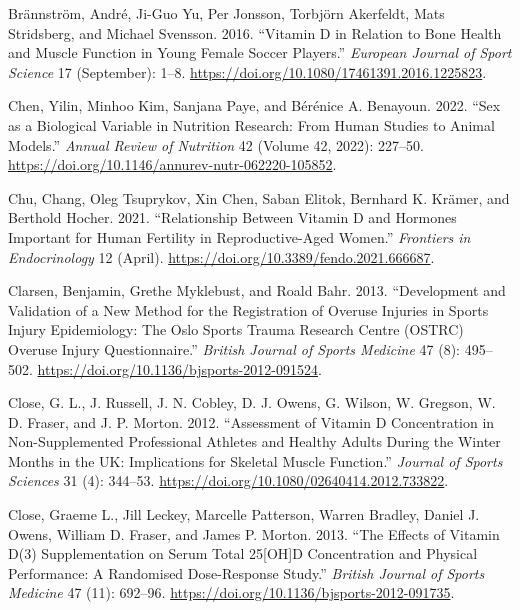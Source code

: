 \documentclass[
]{article}
\newlength{\cslhangindent}
\newenvironment{CSLReferences}[2] %
 {\begin{list}{}{%
  \setlength{\itemindent}{0pt}
  \setlength{\leftmargin}{0pt}
  \setlength{\parsep}{0pt}
  \ifodd #1
   \setlength{\leftmargin}{\cslhangindent}
   \setlength{\itemindent}{-1\cslhangindent}
  \fi
  \setlength{\itemsep}{#2\baselineskip}}}
 {\end{list}}
\begin{document}
\begin{CSLReferences}{1}{0}
Brännström, André, Ji-Guo Yu, Per Jonsson, Torbjörn Akerfeldt, Mats Stridsberg, and Michael Svensson. 2016. {``Vitamin {D} in Relation to Bone Health and Muscle Function in Young Female Soccer Players.''} \emph{European Journal of Sport Science} 17 (September): 1--8. \url{https://doi.org/10.1080/17461391.2016.1225823}.

Chen, Yilin, Minhoo Kim, Sanjana Paye, and Bérénice A. Benayoun. 2022. {``Sex as a {Biological} {Variable} in {Nutrition} {Research}: {From} {Human} {Studies} to {Animal} {Models}.''} \emph{Annual Review of Nutrition} 42 (Volume 42, 2022): 227--50. \url{https://doi.org/10.1146/annurev-nutr-062220-105852}.

Chu, Chang, Oleg Tsuprykov, Xin Chen, Saban Elitok, Bernhard K. Krämer, and Berthold Hocher. 2021. {``Relationship {Between} {Vitamin} {D} and {Hormones} {Important} for {Human} {Fertility} in {Reproductive}-{Aged} {Women}.''} \emph{Frontiers in Endocrinology} 12 (April). \url{https://doi.org/10.3389/fendo.2021.666687}.

Clarsen, Benjamin, Grethe Myklebust, and Roald Bahr. 2013. {``Development and Validation of a New Method for the Registration of Overuse Injuries in Sports Injury Epidemiology: The {Oslo} {Sports} {Trauma} {Research} {Centre} ({OSTRC}) {Overuse} {Injury} {Questionnaire}.''} \emph{British Journal of Sports Medicine} 47 (8): 495--502. \url{https://doi.org/10.1136/bjsports-2012-091524}.

Close, G. L., J. Russell, J. N. Cobley, D. J. Owens, G. Wilson, W. Gregson, W. D. Fraser, and J. P. Morton. 2012. {``Assessment of Vitamin {D} Concentration in Non-Supplemented Professional Athletes and Healthy Adults During the Winter Months in the {UK}: Implications for Skeletal Muscle Function.''} \emph{Journal of Sports Sciences} 31 (4): 344--53. \url{https://doi.org/10.1080/02640414.2012.733822}.

Close, Graeme L., Jill Leckey, Marcelle Patterson, Warren Bradley, Daniel J. Owens, William D. Fraser, and James P. Morton. 2013. {``The Effects of Vitamin {D}(3) Supplementation on Serum Total 25{[}{OH}{]}{D} Concentration and Physical Performance: A Randomised Dose-Response Study.''} \emph{British Journal of Sports Medicine} 47 (11): 692--96. \url{https://doi.org/10.1136/bjsports-2012-091735}.


\end{CSLReferences}
\end{document}
